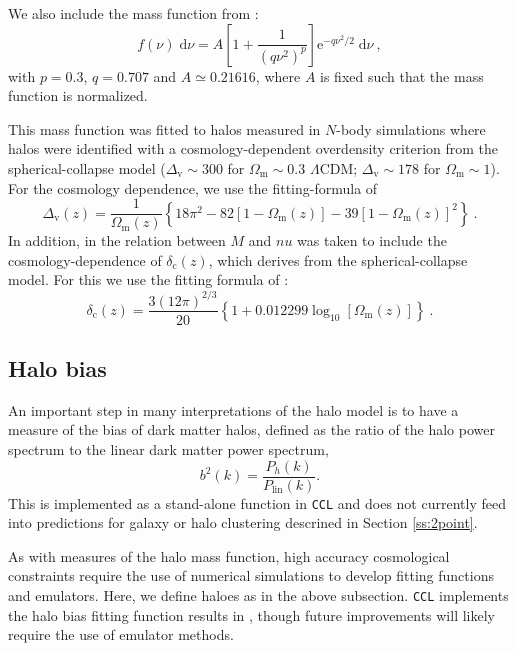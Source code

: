 \documentclass[\docopts]{\docclass}
\newcommand{\ccl}{{\tt CCL}\xspace}
\begin{document}
We also include the mass function from \cite{Sheth1999}:
\begin{equation}
f(\nu)\;\mathrm{d}\nu=A\left[1+\frac{1}{(q\nu^2)^p}\right]\mathrm{e}^{-q\nu^2/2}\;\mathrm{d}\nu\ ,
\label{eq:st_mf}
\end{equation}
with $p=0.3$, $q=0.707$ and $A\simeq 0.21616$, where $A$ is fixed such that the mass function is normalized.

This mass function was fitted to halos measured in $N$-body simulations where halos were identified with a cosmology-dependent overdensity criterion from the spherical-collapse model ($\Delta_\mathrm{v}\sim 300$ for $\Omega_\mathrm{m}\sim 0.3$ $\Lambda$CDM; $\Delta_\mathrm{v}\sim 178$ for $\Omega_\mathrm{m}\sim 1$). For the cosmology dependence, we use the fitting-formula of \cite{Bryan1998}
\begin{equation}
\Delta_\mathrm{v}(z)=\frac{1}{\Omega_\mathrm{m}(z)}\left\{18\pi^2-82[1-\Omega_\mathrm{m}(z)]-39[1-\Omega_\mathrm{m}(z)]^2\right\}\ .
\label{eq:Deltav_Bryan}
\end{equation}
In addition, in \cite{Sheth1999} the relation between $M$ and $nu$ was taken to include the cosmology-dependence of $\delta_\mathrm{c}(z)$, which derives from the spherical-collapse model. For this we use the fitting formula of \cite{Nakamura1997}:
\begin{equation}
\delta_\mathrm{c}(z)=\frac{3(12\pi)^{2/3}}{20}\left\{1+0.012299\log_{10}[\Omega_\mathrm{m}(z)]\right\}\ .
\label{eq:deltac_Nakamura}
\end{equation}


\subsection{Halo bias}

An important step in many interpretations of the halo model is to have a measure of the bias of dark matter halos, defined as the ratio of the halo power spectrum to the linear dark matter power spectrum,
\begin{equation}
  b^2(k) = \frac{P_h(k)}{P_{\mathrm{lin}}(k)}.
  \label{eq:halo_bias}
\end{equation}
This is implemented as a stand-alone function in \ccl and does not currently feed into predictions for galaxy or halo clustering descrined in Section \ref{ss:2point}.

As with measures of the halo mass function, high accuracy cosmological constraints require the use of numerical simulations to develop fitting functions and emulators. Here, we define haloes as in the above subsection. {\tt CCL} implements the halo bias fitting function results in \citet{Tinker2010}, though future improvements will likely require the use of emulator methods.
\end{document}
